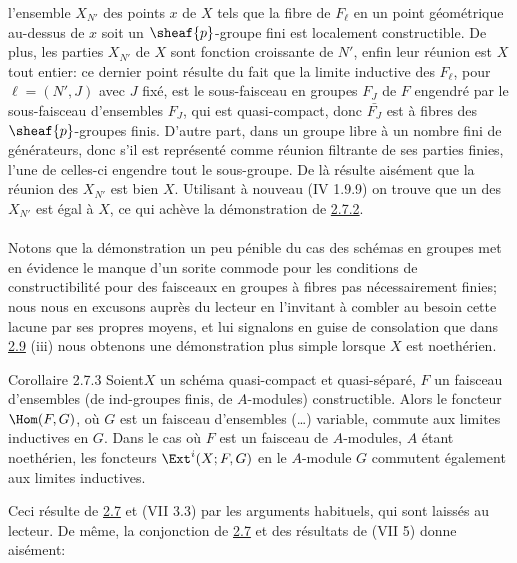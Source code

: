 \documentclass[10pt]{../fichiers-configuration-latex/smfart}
\begin{document}
l'ensemble $X_{N'}$ des points $x$ de $X$ tels que la fibre de
$F_{\ell}$ en un point géométrique au-dessus de $x$ soit un
$\sheaf{p}$-groupe fini est localement constructible. De plus, les parties
$X_{N'}$ de $X$ sont fonction croissante de $N'$, enfin leur réunion
est $X$ tout entier: ce dernier point résulte du fait que la limite
inductive des $F_{\ell}$, pour $\ell=(N',J)$ avec $J$ fixé, est le
sous-faisceau en groupes $F_J$ de $F$ engendré par le sous-faisceau
d'ensembles $F_J$, qui est quasi-compact, donc $\bar{F_J}$ est à
fibres des $\sheaf{p}$-groupes finis. D'autre part, dans un groupe libre à
un nombre fini de générateurs, donc s'il est représenté comme
réunion filtrante de ses parties finies, l'une de celles-ci engendre
tout le sous-groupe. De là résulte aisément que la réunion des
$X_{N'}$ est bien $X$. Utilisant à nouveau (\EGA IV 1.9.9) on trouve
que un des $X_{N'}$ est égal à $X$, ce qui achève la démonstration de
\hyperref[IX.cor2.7.2]{2.7.2}.

\setcounter{subsection}{7}
\setcounter{subsubsection}{2}
\paragraph{}
Notons que la démonstration un peu pénible du cas des schémas en
groupes met en évidence le manque d'un sorite commode pour les
conditions de constructibilité pour des faisceaux en groupes à fibres
pas nécessairement finies; nous nous en excusons auprès du lecteur en
l'invitant à combler au besoin cette lacune par ses propres moyens, et
lui signalons en guise de consolation que dans \hyperref[IX.prop2.9]{2.9} (iii) nous obtenons
une démonstration plus simple lorsque $X$ est noethérien.

\begin{enonce*}{Corollaire 2.7.3}
Soient\pageoriginale $X$ un schéma quasi-compact et quasi-séparé, $F$
un faisceau d'ensembles (\resp de ind-groupes finis, \resp de
$A$-modules) constructible. Alors le foncteur $\Hom(F,G)$, où $G$ est
un faisceau d'ensembles (\resp\ldots) variable, commute aux limites
inductives en $G$. Dans le cas où $F$ est un faisceau de $A$-modules,
$A$ étant noethérien, les foncteurs $\Ext^{i}(X;F,G)$ en le $A$-module
$G$ commutent également aux limites inductives.
\end{enonce*}

Ceci résulte de \hyperref[IX.prop2.7]{2.7} et (VII 3.3) par les arguments habituels, qui sont
laissés au lecteur. De même, la conjonction de \hyperref[IX.prop2.7]{2.7} et des résultats de
(VII 5) donne aisément:
\end{document}
